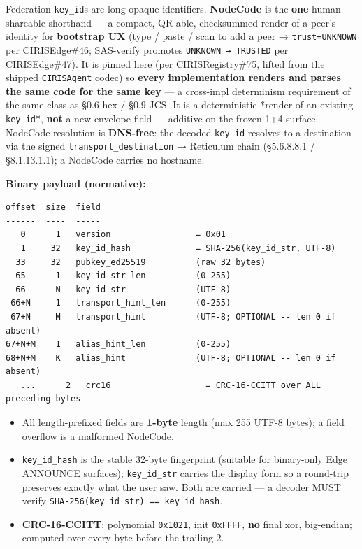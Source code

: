 \documentclass[10pt]{article}
\begin{document}
Federation \texttt{key\_id}s are long opaque identifiers. \textbf{NodeCode} is the \textbf{one} human-shareable shorthand — a compact, QR-able, checksummed render of a peer's identity for \textbf{bootstrap UX} (type / paste / scan to add a peer → \texttt{trust=UNKNOWN} per CIRISEdge\#46; SAS-verify promotes \texttt{UNKNOWN → TRUSTED} per CIRISEdge\#47). It is pinned here (per CIRISRegistry\#75, lifted from the shipped \texttt{CIRISAgent} codec) so \textbf{every implementation renders and parses the same code for the same key} — a cross-impl determinism requirement of the same class as §0.6 hex / §0.9 JCS. It is a deterministic *render of an existing \texttt{key\_id}*, \textbf{not} a new envelope field — additive on the frozen 1+4 surface. NodeCode resolution is \textbf{DNS-free}: the decoded \texttt{key\_id} resolves to a destination via the signed \texttt{transport\_destination} → Reticulum chain (§5.6.8.8.1 / §8.1.13.1.1); a NodeCode carries no hostname.


\textbf{Binary payload (normative):}


\begin{lstlisting}
offset  size  field
------  ----  -----
   0      1   version                 = 0x01
   1     32   key_id_hash             = SHA-256(key_id_str, UTF-8)
  33     32   pubkey_ed25519          (raw 32 bytes)
  65      1   key_id_str_len          (0-255)
  66      N   key_id_str              (UTF-8)
 66+N     1   transport_hint_len      (0-255)
 67+N     M   transport_hint          (UTF-8; OPTIONAL -- len 0 if absent)
67+N+M    1   alias_hint_len          (0-255)
68+N+M    K   alias_hint              (UTF-8; OPTIONAL -- len 0 if absent)
   ...      2   crc16                   = CRC-16-CCITT over ALL preceding bytes
\end{lstlisting}

\begin{itemize}\setlength\itemsep{0pt}
\item All length-prefixed fields are \textbf{1-byte} length (max 255 UTF-8 bytes); a field overflow is a malformed NodeCode.
\item \texttt{key\_id\_hash} is the stable 32-byte fingerprint (suitable for binary-only Edge ANNOUNCE surfaces); \texttt{key\_id\_str} carries the display form so a round-trip preserves exactly what the user saw. Both are carried — a decoder MUST verify \texttt{SHA-256(key\_id\_str) == key\_id\_hash}.
\item \textbf{CRC-16-CCITT}: polynomial \texttt{0x1021}, init \texttt{0xFFFF}, \textbf{no} final xor, big-endian; computed over every byte before the trailing 2.
\end{itemize}
\end{document}
